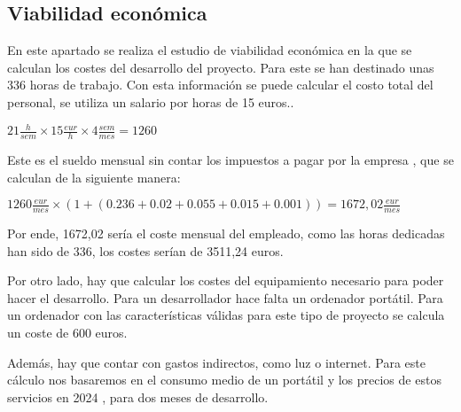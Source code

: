 \subsection{Viabilidad económica}
En este apartado se realiza el estudio de viabilidad económica en la que se calculan los costes del desarrollo del proyecto. Para este  se han destinado unas 336 horas de trabajo. Con esta información se puede calcular el costo total del personal, se utiliza un salario por horas de 15 euros.\cite{smi}.
\begin{center}
    \begin{math}  21 \frac{h}{sem} \times 15 \frac{eur}{h} \times 4 \frac{sem}{mes} = 1260  \end{math}    
\end{center}


Este es el sueldo mensual sin contar los impuestos a pagar por la empresa \cite{tabla-impuestos}, que se calculan de la siguiente  manera:
\begin{center}
    \begin{math}1260 \frac{eur}{mes} \times (1 + (0.236 + 0.02 + 0.055 + 0.015+0.001)) = 1672,02 \frac{eur}{mes}\end{math}
\end{center}

Por ende, 1672,02 sería el coste mensual del empleado, como las horas dedicadas han sido de 336, los costes serían de 3511,24 euros.

Por otro lado, hay que calcular los costes del equipamiento necesario para poder hacer el desarrollo. Para un desarrollador hace falta un ordenador portátil. Para un ordenador con las características válidas para este tipo de proyecto se calcula un coste de 600 euros.

\begin{table}[H]
	\centering
	\caption{Costes de hardware}
\end{table}

Además, hay que contar con gastos indirectos, como luz o internet. Para este cálculo nos basaremos en el consumo medio de un portátil \cite{consumo-portatil} y los precios de estos servicios en 2024 \cite{evolución-precios-OCU}, para dos meses de desarrollo. 

